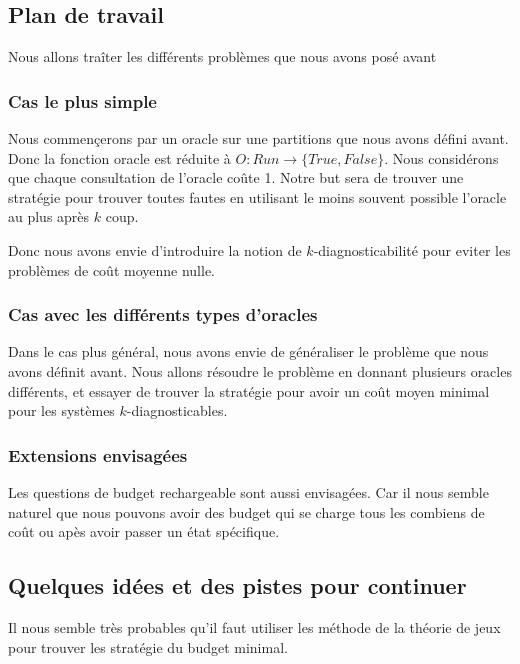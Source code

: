 \documentclass[a4paper,10pt]{article}
\begin{document}
\subsection{Plan de travail}

Nous allons tra\^iter les diff\'erents probl\`emes que nous avons pos\'e avant

\subsubsection{Cas le plus simple}

Nous commen\c cerons par un oracle sur une partitions que nous avons d\'efini avant. Donc la fonction oracle est r\'eduite \`a $O : Run \to \{True, False\}$. Nous consid\'erons que chaque consultation de l'oracle co\^ute 1. Notre but sera de trouver une strat\'egie pour trouver toutes fautes en utilisant le moins souvent possible l'oracle au plus apr\`es $k$ coup.

Donc nous avons envie d'introduire la notion de $k$-diagnosticabilit\'e pour eviter les probl\`emes de co\^ut moyenne nulle.

\subsubsection{Cas avec les diff\'erents types d'oracles}

Dans le cas plus g\'en\'eral, nous avons envie de g\'en\'eraliser le probl\`eme que nous avons d\'efinit avant. Nous allons r\'esoudre le probl\`eme en donnant plusieurs oracles diff\'erents, et essayer de trouver la strat\'egie pour avoir un co\^ut moyen minimal pour les syst\`emes $k$-diagnosticables.

\subsubsection{Extensions envisag\'ees}
Les questions de budget rechargeable sont aussi envisag\'ees. Car il nous semble naturel que nous pouvons avoir des budget qui se charge tous les combiens de co\^ut ou ap\`es avoir passer un \'etat sp\'ecifique.

\subsection{Quelques id\'ees et des pistes pour continuer}

Il nous semble tr\`es probables qu'il faut utiliser les m\'ethode de la th\'eorie de jeux pour trouver les strat\'egie du budget minimal.
\end{document}
